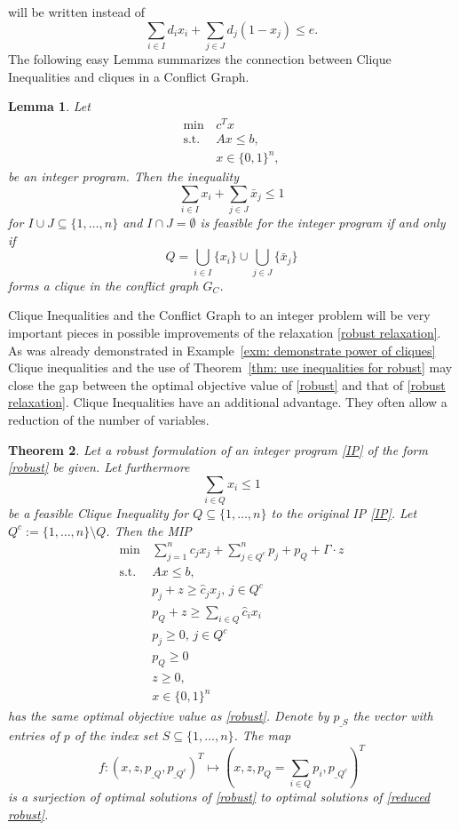 \documentclass[titlepage, a4paper]{amsbook}
\theoremstyle{plain}
\newtheorem{thm}{Theorem}[chapter]
\newtheorem{lem}[thm]{Lemma}
\theoremstyle{break}
\theoremstyle{definition}
\theoremstyle{remark}
\numberwithin{equation}{thm}
\begin{document}
will be written instead of
\[\sum_{i \in I}d_i x_i + \sum_{j \in J}d_j(1-x_j) \leq e.\]
The following easy Lemma summarizes the connection between Clique Inequalities and cliques in a Conflict Graph.
\begin{lem}
Let \begin{align*}
    \min\,&c^T x \\
    \text{s.t. } &Ax \leq b, \\
    &x \in \{0,1\}^n,
\end{align*}
be an integer program. Then the inequality
\[\sum_{i \in I} x_i + \sum_{j \in J}\bar{x}_j \leq 1\]
for $I \cup J \subseteq \{1, \ldots, n\}$ and $I \cap J = \emptyset$ is feasible for the integer program if and only if
\[Q = \bigcup_{i \in I}\{x_i\} \cup \bigcup_{j \in J}\{\bar{x}_j\}\]
forms a clique in the conflict graph $G_C$.
\end{lem}
Clique Inequalities and the Conflict Graph to an integer problem will be very important pieces in possible improvements of the relaxation \eqref{robust relaxation}. As was already demonstrated in Example~\ref{exm: demonstrate power of cliques} Clique inequalities and the use of Theorem~\ref{thm: use inequalities for robust} may close the gap between the optimal objective value of \eqref{robust} and that of \eqref{robust relaxation}. Clique Inequalities have an additional advantage. They often allow a reduction of the number of variables.
\begin{thm}\label{thm: variable reduction with cliques}
Let a robust formulation of an integer program \eqref{IP} of the form \eqref{robust} be given. Let furthermore
\[\sum_{i \in Q}x_i \leq 1\]
be a feasible Clique Inequality for $Q \subseteq \{1, \ldots, n\}$ to the original IP \eqref{IP}. Let $Q^c:=\{1, \ldots, n\} \setminus Q$.
Then the MIP
\begin{equation}\label{reduced robust}
\begin{split}
    \min\, &\sum_{j=1}^{n} c_j x_j + \sum_{j \in Q^c}^{n}p_j+p_Q + \Gamma \cdot z\\
    \text{s.t. } &Ax \leq b, \\
    &p_j+ z \geq \hat{c}_jx_j, \, j \in Q^c\\
    &p_Q+ z \geq \sum_{i \in Q} \hat{c}_ix_i \\
  &p_j \geq 0, \, j \in Q^c\\
  &p_Q \geq 0 \\
  &z \geq 0, \\
    &x \in \{0,1\}^n
\end{split}
\end{equation}
has the same optimal objective value as \eqref{robust}.
Denote by $p_{\_S}$ the vector with entries of $p$ of the index set $S \subseteq \{1, \ldots, n\}$. The map 
\[f:(x, z, p_{\_Q}, p_{\_Q^c})^T \mapsto (x, z, p_Q=\sum_{i \in Q}p_i, p_{\_Q^c})^T \]
is a surjection of optimal solutions of \eqref{robust} to optimal solutions of \eqref{reduced robust}.
\end{thm}
\end{document}
